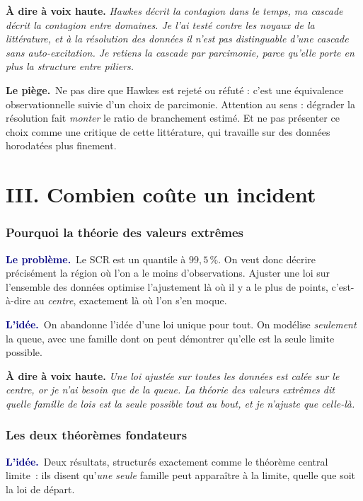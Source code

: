\documentclass[11pt,a4paper]{article}
\newcommand{\lequoi}[1]{\smallskip\noindent\textcolor{navy}{\textbf{Le problème.}}\ #1\par}
\newcommand{\lidee}[1]{\smallskip\noindent\textcolor{navy}{\textbf{L'idée.}}\ #1\par}
\newcommand{\lepiege}[1]{\smallskip\noindent\textcolor{accent}{\textbf{Le piège.}}\ #1\par}
\newcommand{\laphrase}[1]{\begin{phrasebox}\textbf{À dire à voix haute.} \emph{#1}\end{phrasebox}}
\begin{document}
\laphrase{Hawkes décrit la contagion dans le temps, ma cascade décrit la contagion entre domaines.
Je l'ai testé contre les noyaux de la littérature, et à la résolution des données il n'est pas
distinguable d'une cascade sans auto-excitation. Je retiens la cascade par parcimonie, parce
qu'elle porte en plus la structure entre piliers.}

\lepiege{Ne pas dire que Hawkes est rejeté ou réfuté : c'est une équivalence observationnelle
suivie d'un choix de parcimonie. Attention au sens : dégrader la résolution fait \emph{monter} le
ratio de branchement estimé. Et ne pas présenter ce choix comme une critique de cette littérature,
qui travaille sur des données horodatées plus finement.}

\part*{III. Combien coûte un incident}

\section{Pourquoi la théorie des valeurs extrêmes}

\lequoi{Le SCR est un quantile à $99{,}5\,\%$. On veut donc décrire précisément la région
où l'on a le moins d'observations. Ajuster une loi sur l'ensemble des données optimise
l'ajustement là où il y a le plus de points, c'est-à-dire au \emph{centre}, exactement là
où l'on s'en moque.}

\lidee{On abandonne l'idée d'une loi unique pour tout. On modélise \emph{seulement} la
queue, avec une famille dont on peut démontrer qu'elle est la seule limite possible.}

\laphrase{Une loi ajustée sur toutes les données est calée sur le centre, or je n'ai besoin
que de la queue. La théorie des valeurs extrêmes dit quelle famille de lois est la seule
possible tout au bout, et je n'ajuste que celle-là.}

\section{Les deux théorèmes fondateurs}

\lidee{Deux résultats, structurés exactement comme le théorème central limite~: ils disent
qu'\emph{une seule} famille peut apparaître à la limite, quelle que soit la loi de départ.}
\end{document}
